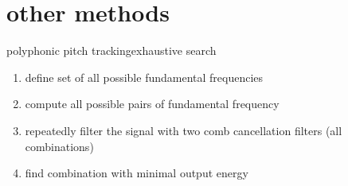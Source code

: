     \section[other]{other methods}
	\begin{frame}{polyphonic pitch tracking}{exhaustive search}
		\begin{enumerate}
			\item	define set of all possible fundamental frequencies
			\pause
			\item	compute all possible pairs of fundamental frequency
			\pause
			\item 	repeatedly filter the signal with two comb cancellation filters (all combinations)
			\pause
			\item	find combination with minimal output energy
		\end{enumerate}
	\end{frame}
	

